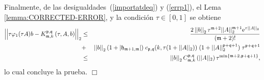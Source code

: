 Finalmente, de las desigualdades~(\ref{importatdeq}) y (\ref{errp1}), el Lema \ref{lemma:CORRECTED-ERROR}, y la condición $\tau \in [0,1]$ se obtiene
\begin{eqnarray*}
	\left\lvert\left\lvert  \tau \varphi_1(\tau A)b-  K_{\mathfrak{m},k}^{\mathfrak{p},\mathfrak{q}}\left( \tau,  A , b \right)\right\rvert\right\rvert_2
	&\leq& \frac{2 \left\lvert \left\lvert b \right\rvert \right\rvert_2 \tau^{\mathfrak{m}+2}  \vert\lvert A\rvert\rvert^{\mathfrak{m}+1}_2
		\mathrm{e}^{\tau \lvert\lvert A\rvert\rvert_2}}{(\mathfrak{m}+2)!}\\
	&+&
	\left\lvert \left\lvert b \right\rvert \right\rvert_2 (1+\lvert\mathfrak{h}_{\mathfrak{m}+1,\mathfrak{m}}\rvert) \; c_{\mathfrak{p},\mathfrak{q}}(k,\tau (1+\lvert\lvert A \rvert\rvert_2))
	\; (1 + \lvert\lvert A \rvert\rvert_2^{\mathfrak{p}+\mathfrak{q}+1}) \; \tau^{\mathfrak{p}+\mathfrak{q}+1}\\
	& \leq & \left\lvert \left\lvert b \right\rvert \right\rvert_2 C_{\mathfrak{m},k}^{\mathfrak{p},\mathfrak{q}}\left(\lvert\lvert A \rvert\rvert_2\right)\tau^{\mathrm{min}\left\{ \mathfrak{m}+2,\mathfrak{p}+\mathfrak{q}+1 \right\}},
\end{eqnarray*}
lo cual concluye la prueba.
$\Box$

